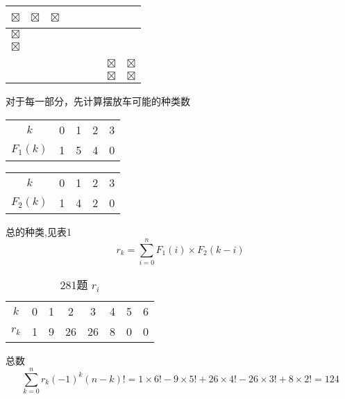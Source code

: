 \documentclass[UTF8]{ctexart}
\begin{document}
\begin{table}[h]
  \centering
  \begin{tabular}{|l|l|l|l|l|l|} 
  \hline
  $\boxtimes$ & $\boxtimes$ & $\boxtimes$ & ~~~~&                              &                                \\ 
  \hline
  $\boxtimes$ &                               &                               &  &                               &                                \\ 
  \hline
  $\boxtimes$ &                               &                               &  &                               &                                \\ 
  \hline
                                &                               &                               &  &                               &                                \\ 
  \hline
                                &                               &                               &  & $\boxtimes$ & $\boxtimes$  \\ 
  \hline
                                &                               &                               &  & $\boxtimes$ & $\boxtimes$  \\
  \hline
  \end{tabular}
  \end{table}

对于每一部分，先计算摆放车可能的种类数

\begin{table}[h]
    \centering
    \begin{tabular}{c|cccc} 
    \toprule
    $k$     & 0 & 1 & 2 & 3  \\
    $F_1(k)$ & 1 & 5 & 4 & 0  \\
    \bottomrule
    \end{tabular}

    \begin{tabular}{c|cccc}
      \toprule
      $k$     & 0 & 1 & 2 & 3  \\
      $F_2(k)$ & 1 & 4 & 2 & 0  \\
      \bottomrule
      \end{tabular}

\end{table}

总的种类,见表1
$$r_k = {\sum_{i=0}^{n} F_1(i)} \times F_2(k-i)$$

\begin{table}[h]
  \centering
  \caption{281题 $r_i$}
  \begin{tabular}{c|ccccccc} 
  \toprule
  $k$ & 0 & 1 & 2  & 3  & 4 & 5 & 6  \\
  $r_k$ & 1 & 9 & 26 & 26 & 8 & 0 & 0  \\
  \bottomrule
  \end{tabular}
  \end{table}

总数
$$
\sum_{k=0}^{n} r_k (-1)^k (n-k)! =
1 \times 6! - 9 \times 5! + 26 \times 4! - 26 \times 3! + 8 \times 2! = 124
$$
\end{document}
